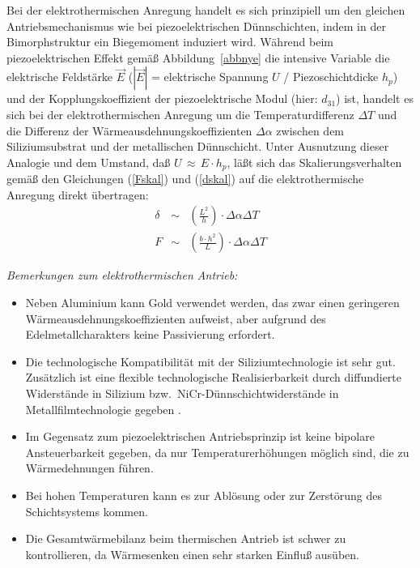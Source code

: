 \vspace*{0.5cm}

Bei der elektrothermischen Anregung handelt es sich prinzipiell um
den gleichen Antriebsmechanismus wie bei piezoelektrischen Dünnschichten,
indem in der Bimorphstruktur ein Biegemoment induziert wird.
Während beim piezoelektrischen Effekt gemäß Abbildung~\ref{abbnye} die
intensive Variable die elektrische Feldstärke $\vec E$
($|\vec E|$ = elektrische Spannung $U$ / Piezoschichtdicke $h_{p}$) und der
Kopplungskoeffizient der piezoelektrische Modul (hier: $d_{31}$) ist,
handelt es sich bei der elektrothermischen Anregung um die
Temperaturdifferenz $\Delta T$ und die Differenz der
Wärmeausdehnungskoeffizienten $\Delta \alpha$ zwischen
dem Siliziumsubstrat und der metallischen Dünnschicht.
Unter Ausnutzung dieser Analogie und dem Umstand, daß
$U \, \approx \, E \cdot h_{p}$, läßt sich das Skalierungsverhalten
gemäß den Gleichungen (\ref{Fskal}) und (\ref{dskal}) auf die
elektrothermische Anregung direkt übertragen:
\begin{eqnarray}
\label{dvont}
  \delta & \sim &
  \left( \frac{L^{2}}{h} \right) \cdot \Delta \alpha \Delta T  \\
\label{fvont}
   F  & \sim & \left( \frac{b \cdot h^{2}}{L} \right)
               \cdot \Delta \alpha \Delta T
\end{eqnarray}


{\em Bemerkungen zum elektrothermischen Antrieb:}
\begin{itemize}
\item Neben Aluminium kann Gold verwendet werden, das zwar einen
geringeren Wärmeausdehnungskoeffizienten aufweist, aber aufgrund des
Edelmetallcharakters keine Passivierung erfordert.
\item Die technologische Kompatibilität mit der Siliziumtechnologie ist
sehr gut. Zusätzlich ist eine flexible technologische Realisierbarkeit
durch diffundierte Widerstände in Silizium bzw.\ NiCr-Dünnschichtwiderstände
in Metallfilmtechnologie gegeben \cite{Bar93}.
\item Im Gegensatz zum piezoelektrischen Antriebsprinzip ist keine bipolare
Ansteuerbarkeit gegeben, da nur Temperaturerhöhungen möglich sind, die zu
Wärmedehnungen führen.
\item Bei hohen Temperaturen kann es zur Ablösung oder zur Zerstörung
des Schichtsystems kommen.
\item Die Gesamtwärmebilanz beim thermischen Antrieb ist schwer zu
kontrollieren, da Wärmesenken einen sehr starken Einfluß ausüben.
\end{itemize}
